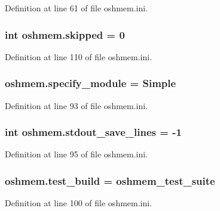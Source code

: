 Definition at line 61 of file oshmem.\-ini.

\hypertarget{namespaceoshmem_ac95f6ffc4fc812c485f85e0cf7f14108}{
\subsubsection[{skipped}]{\setlength{\rightskip}{0pt plus 5cm}int oshmem.\-skipped = 0}}\label{namespaceoshmem_ac95f6ffc4fc812c485f85e0cf7f14108}


Definition at line 110 of file oshmem.\-ini.

\hypertarget{namespaceoshmem_a6f6a354853c6118a9f077a4eeb448f4c}{
\subsubsection[{specify\-\_\-module}]{\setlength{\rightskip}{0pt plus 5cm}oshmem.\-specify\-\_\-module = Simple}}\label{namespaceoshmem_a6f6a354853c6118a9f077a4eeb448f4c}


Definition at line 93 of file oshmem.\-ini.

\hypertarget{namespaceoshmem_a4cdc6e4a0db8e6530f255ad825827e18}{
\subsubsection[{stdout\-\_\-save\-\_\-lines}]{\setlength{\rightskip}{0pt plus 5cm}int oshmem.\-stdout\-\_\-save\-\_\-lines = -\/1}}\label{namespaceoshmem_a4cdc6e4a0db8e6530f255ad825827e18}


Definition at line 95 of file oshmem.\-ini.

\hypertarget{namespaceoshmem_a085f8f03de29586da15a246776960091}{
\subsubsection[{test\-\_\-build}]{\setlength{\rightskip}{0pt plus 5cm}oshmem.\-test\-\_\-build = oshmem\-\_\-test\-\_\-suite}}\label{namespaceoshmem_a085f8f03de29586da15a246776960091}


Definition at line 100 of file oshmem.\-ini.

